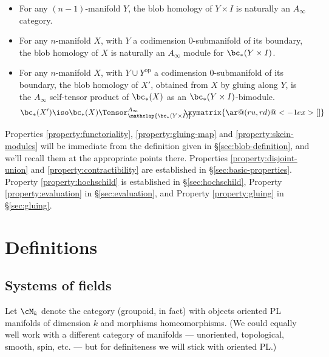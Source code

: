 \documentclass[11pt,leqno]{amsart}
\begin{document}
\begin{property}
\label{property:gluing}%
\mbox{}%
\begin{itemize}
\item For any $(n-1)$-manifold $Y$, the blob homology of $Y \times I$ is
naturally an $A_\infty$ category. %

\item For any $n$-manifold $X$, with $Y$ a codimension $0$-submanifold of its boundary, the blob homology of $X$ is naturally an
$A_\infty$ module for $\bc_*(Y \times I)$.

\item For any $n$-manifold $X$, with $Y \cup Y^{\text{op}}$ a codimension
$0$-submanifold of its boundary, the blob homology of $X'$, obtained from
$X$ by gluing along $Y$, is the $A_\infty$ self-tensor product of
$\bc_*(X)$ as an $\bc_*(Y \times I)$-bimodule.
\begin{equation*}
\bc_*(X') \iso \bc_*(X) \Tensor^{A_\infty}_{\mathclap{\bc_*(Y \times I)}} \!\!\!\!\!\!\xymatrix{ \ar@(ru,rd)@<-1ex>[]}
\end{equation*}
\end{itemize}
\end{property}

Properties \ref{property:functoriality}, \ref{property:gluing-map} and \ref{property:skein-modules} will be immediate from the definition given in
\S \ref{sec:blob-definition}, and we'll recall them at the appropriate points there. 
Properties \ref{property:disjoint-union} and \ref{property:contractibility} are established in \S \ref{sec:basic-properties}.
Property \ref{property:hochschild} is established in \S \ref{sec:hochschild}, Property \ref{property:evaluation} in \S \ref{sec:evaluation},
and Property \ref{property:gluing} in \S \ref{sec:gluing}.

\section{Definitions}
\label{sec:definitions}

\subsection{Systems of fields}
\label{sec:fields}

Let $\cM_k$ denote the category (groupoid, in fact) with objects 
oriented PL manifolds of dimension
$k$ and morphisms homeomorphisms.
(We could equally well work with a different category of manifolds ---
unoriented, topological, smooth, spin, etc. --- but for definiteness we
will stick with oriented PL.)
\end{document}
